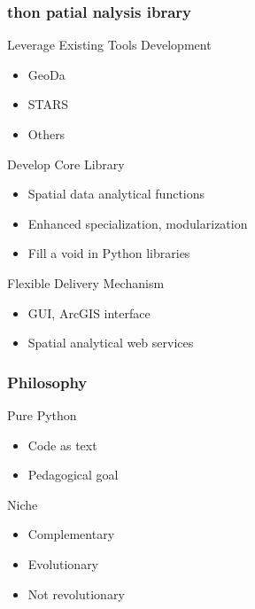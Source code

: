 \begin{frame}
	\frametitle{{\color{green}{Py}}thon {\color{green}{S}}patial {\color{green}{A}}nalysis {\color{green}{L}}ibrary}
 
\begin{block}{Leverage Existing Tools Development}
 \begin{itemize}
 \item GeoDa 
 \item STARS
 \item Others
 \end{itemize}
 \end{block} 
\begin{block}{Develop Core Library}
 \begin{itemize}
 \item Spatial data analytical functions 
 \item Enhanced specialization, modularization 
 \item Fill a void in Python libraries 
 \end{itemize}
 \end{block} 
\begin{block}{Flexible Delivery Mechanism}
 \begin{itemize}
 \item GUI, ArcGIS interface 
 \item Spatial analytical web services 
 \end{itemize}
 \end{block} \end{frame} 

\begin{frame}
	\frametitle{Philosophy}
 
\begin{block}{Pure Python}
 \begin{itemize}
 \item Code as text 
 \item Pedagogical goal 
 \end{itemize}
 \end{block} 
\begin{block}{Niche}
 \begin{itemize}
 \item Complementary 
 \item Evolutionary 
 \item Not revolutionary 
 \end{itemize}
 \end{block} \end{frame} 

